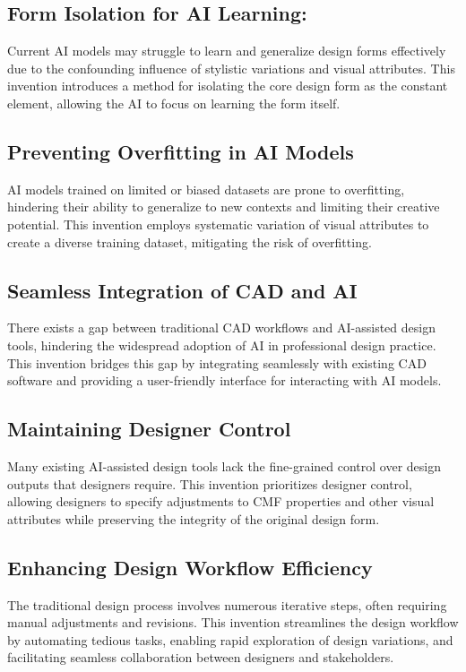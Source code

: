 \documentclass{article}
\begin{document}
\subsection{Form Isolation for AI Learning:}
Current AI models may struggle to learn and generalize design forms effectively due to the confounding influence of stylistic variations and visual attributes. This invention introduces a method for isolating the core design form as the constant element, allowing the AI to focus on learning the form itself.

\subsection{Preventing Overfitting in AI Models}
AI models trained on limited or biased datasets are prone to overfitting, hindering their ability to generalize to new contexts and limiting their creative potential. This invention employs systematic variation of visual attributes to create a diverse training dataset, mitigating the risk of overfitting.

\subsection{Seamless Integration of CAD and AI}
There exists a gap between traditional CAD workflows and AI-assisted design tools, hindering the widespread adoption of AI in professional design practice. This invention bridges this gap by integrating seamlessly with existing CAD software and providing a user-friendly interface for interacting with AI models.

\subsection{Maintaining Designer Control}
Many existing AI-assisted design tools lack the fine-grained control over design outputs that designers require. This invention prioritizes designer control, allowing designers to specify adjustments to CMF properties and other visual attributes while preserving the integrity of the original design form.

\subsection{Enhancing Design Workflow Efficiency}
The traditional design process involves numerous iterative steps, often requiring manual adjustments and revisions. This invention streamlines the design workflow by automating tedious tasks, enabling rapid exploration of design variations, and facilitating seamless collaboration between designers and stakeholders.
\end{document}
